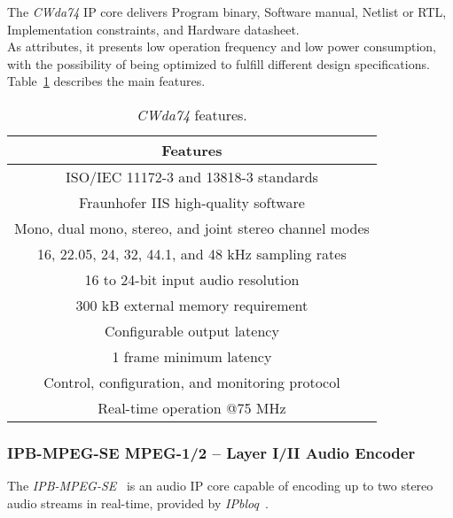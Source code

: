 The \textit{CWda74} IP core delivers Program binary, Software manual, Netlist or RTL, Implementation constraints, and Hardware datasheet.\\
As attributes, it presents low operation frequency and low power consumption, with the possibility of being optimized to fulfill different design specifications.
Table~\ref{tab:coreworks} describes the main features.

\vspace{0.5cm}

\begin{table}[H]
    \centering
    \begin{tabular}{|c|}
        \hline
        \textbf{Features} \\
        \hline
         ISO/IEC 11172-3 and 13818-3 standards \\
         \hline
         Fraunhofer IIS high-quality software\\
         \hline
         Mono, dual mono, stereo, and joint stereo channel modes \\
         \hline
         16, 22.05, 24, 32, 44.1, and 48 kHz sampling rates \\
         \hline
         16 to 24-bit input audio resolution \\
         \hline
         300 kB external memory requirement\\
         \hline
         Configurable output latency \\
         \hline
         1 frame minimum latency\\
         \hline
         Control, configuration, and monitoring protocol \\
         \hline
         Real-time operation @75 MHz \\
         \hline
    \end{tabular}
    \caption{\textit{CWda74} features.}
    \label{tab:coreworks}
\end{table}

\vspace{0.3cm}

\subsubsection{IPB-MPEG-SE MPEG-1/2 – Layer I/II Audio Encoder}

The \textit{IPB-MPEG-SE}~\cite{ipb-mpeg-se} is an audio IP core capable of encoding up to two stereo audio streams in real-time, provided by \textit{IPbloq}~\cite{ipbloq}.


